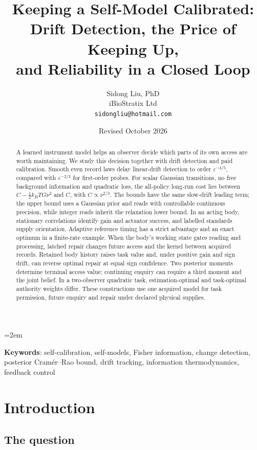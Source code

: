 \documentclass[12pt]{article}
\title{Keeping a Self-Model Calibrated:\\
Drift Detection, the Price of Keeping Up,\\
and Reliability in a Closed Loop}
\author{Sidong Liu, PhD \\
\small iBioStratix Ltd \\
\small \texttt{sidongliu@hotmail.com}}
\date{Revised October 2026}
\theoremstyle{definition}
\begin{document}
\emergencystretch=2em
\raggedbottom
\maketitle

\begin{abstract}
A learned instrument model helps an observer decide which parts of its own access are worth maintaining. We study this decision together with drift detection and paid calibration. Smooth even record laws delay linear-drift detection to order $\varepsilon^{-4/5}$, compared with $\varepsilon^{-2/3}$ for first-order probes. For scalar Gaussian transitions, no free background information and quadratic loss, the all-policy long-run cost lies between $C-\tfrac12k_BTG\nu^2$ and $C$, with $C\propto\nu^{2/3}$. The bounds have the same slow-drift leading term; the upper bound uses a Gaussian prior and reads with controllable continuous precision, while integer reads inherit the relaxation lower bound. In an acting body, stationary correlations identify gain and actuator success, and labelled standards supply orientation. Adaptive reference timing has a strict advantage and an exact optimum in a finite-rate example. When the body's working state gates reading and processing, latched repair changes future access and the kernel between acquired records. Retained body history raises task value and, under positive gain and sign drift, can reverse optimal repair at equal sign confidence. Two posterior moments determine terminal access value; continuing enquiry can require a third moment and the joint belief. In a two-observer quadratic task, estimation-optimal and task-optimal authority weights differ. These constructions use one acquired model for task permission, future enquiry and repair under declared physical supplies.
\end{abstract}

\medskip
\noindent\textbf{Keywords}: self-calibration, self-models, Fisher information, change detection, posterior Cram\'er--Rao bound, drift tracking, information thermodynamics, feedback control

\section{Introduction}
\label{sec:intro}

\subsection{The question}
\label{subsec:question}
\end{document}
